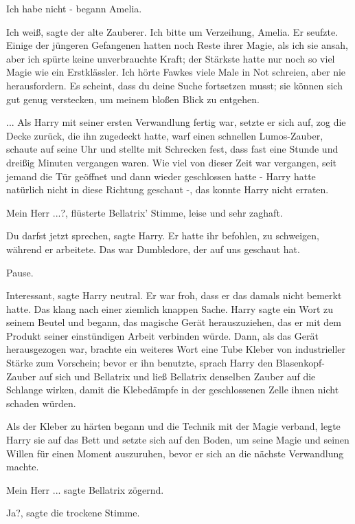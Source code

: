\glqq{}Ich habe nicht -\grqq{} begann Amelia.

\glqq{}Ich weiß\grqq{}, sagte der alte Zauberer. \glqq{}Ich bitte um Verzeihung,
Amelia.\grqq{} Er seufzte. \glqq{}Einige der jüngeren Gefangenen hatten noch Reste
ihrer Magie, als ich sie ansah, aber ich spürte keine unverbrauchte Kraft; der
Stärkste hatte nur noch so viel Magie wie ein Erstklässler. Ich hörte Fawkes
viele Male in Not schreien, aber nie herausfordern. Es scheint, dass du deine
Suche fortsetzen musst; sie können sich gut genug verstecken, um meinem bloßen
Blick zu entgehen.\grqq{}

... Als Harry mit seiner ersten Verwandlung fertig war, setzte er sich auf, zog
die Decke zurück, die ihn zugedeckt hatte, warf einen schnellen Lumos-Zauber,
schaute auf seine Uhr und stellte mit Schrecken fest, dass fast eine Stunde und
dreißig Minuten vergangen waren. Wie viel von dieser Zeit war vergangen, seit
jemand die Tür geöffnet und dann wieder geschlossen hatte - Harry hatte
natürlich nicht in diese Richtung geschaut -, das konnte Harry nicht erraten.

\glqq{}Mein Herr ...?\grqq{}, flüsterte Bellatrix' Stimme, leise und sehr zaghaft.

\glqq{}Du darfst jetzt sprechen\grqq{}, sagte Harry. Er hatte ihr befohlen, zu
schweigen, während er arbeitete. \glqq{}Das war Dumbledore, der auf uns geschaut
hat.\grqq{}

Pause.

\glqq{}Interessant\grqq{}, sagte Harry neutral. Er war froh, dass er das damals
nicht bemerkt hatte. Das klang nach einer ziemlich knappen Sache. Harry sagte
ein Wort zu seinem Beutel und begann, das magische Gerät herauszuziehen, das er
mit dem Produkt seiner einstündigen Arbeit verbinden würde. Dann, als das Gerät
herausgezogen war, brachte ein weiteres Wort eine Tube Kleber von industrieller
Stärke zum Vorschein; bevor er ihn benutzte, sprach Harry den Blasenkopf-Zauber
auf sich und Bellatrix und ließ Bellatrix denselben Zauber auf die Schlange
wirken, damit die Klebedämpfe in der geschlossenen Zelle ihnen nicht schaden
würden.

Als der Kleber zu härten begann und die Technik mit der Magie verband, legte
Harry sie auf das Bett und setzte sich auf den Boden, um seine Magie und seinen
Willen für einen Moment auszuruhen, bevor er sich an die nächste Verwandlung
machte.

\glqq{}Mein Herr ...\grqq{} sagte Bellatrix zögernd.

\glqq{}Ja?\grqq{}, sagte die trockene Stimme.

